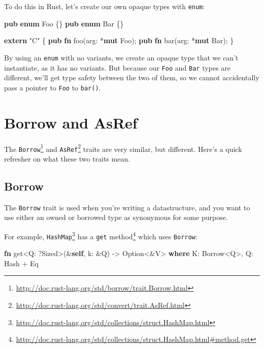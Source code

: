 \documentclass[a4paper,]{book}
\newenvironment{Shaded}{\begin{snugshade}}{\end{snugshade}}
\newcommand{\KeywordTok}[1]{\textcolor[rgb]{0.13,0.29,0.53}{\textbf{{#1}}}}
\newcommand{\DataTypeTok}[1]{\textcolor[rgb]{0.13,0.29,0.53}{{#1}}}
\newcommand{\StringTok}[1]{\textcolor[rgb]{0.31,0.60,0.02}{{#1}}}
\newcommand{\BuiltInTok}[1]{{#1}}
\newcommand{\NormalTok}[1]{{#1}}
\renewcommand{\href}[2]{#2\footnote{\url{#1}}}
\begin{document}
To do this in Rust, let's create our own opaque types with
\texttt{enum}:

\begin{Shaded}
\begin{Highlighting}[]
\KeywordTok{pub} \KeywordTok{enum} \NormalTok{Foo \{\}}
\KeywordTok{pub} \KeywordTok{enum} \NormalTok{Bar \{\}}

\KeywordTok{extern} \StringTok{"C"} \NormalTok{\{}
    \KeywordTok{pub} \KeywordTok{fn} \NormalTok{foo(arg: *}\KeywordTok{mut} \NormalTok{Foo);}
    \KeywordTok{pub} \KeywordTok{fn} \NormalTok{bar(arg: *}\KeywordTok{mut} \NormalTok{Bar);}
\NormalTok{\}}
\end{Highlighting}
\end{Shaded}

By using an \texttt{enum} with no variants, we create an opaque type
that we can't instantiate, as it has no variants. But because our
\texttt{Foo} and \texttt{Bar} types are different, we'll get type safety
between the two of them, so we cannot accidentally pass a pointer to
\texttt{Foo} to \texttt{bar()}.

\section{Borrow and AsRef}\label{sec--borrow-and-asref}

The
\href{http://doc.rust-lang.org/std/borrow/trait.Borrow.html}{\texttt{Borrow}}
and
\href{http://doc.rust-lang.org/std/convert/trait.AsRef.html}{\texttt{AsRef}}
traits are very similar, but different. Here's a quick refresher on what
these two traits mean.

\subsection{Borrow}\label{borrow}

The \texttt{Borrow} trait is used when you're writing a datastructure,
and you want to use either an owned or borrowed type as synonymous for
some purpose.

For example,
\href{http://doc.rust-lang.org/std/collections/struct.HashMap.html}{\texttt{HashMap}}
has a
\href{http://doc.rust-lang.org/std/collections/struct.HashMap.html\#method.get}{\texttt{get}
method} which uses \texttt{Borrow}:

\begin{Shaded}
\begin{Highlighting}[]
\KeywordTok{fn} \NormalTok{get<Q: ?}\BuiltInTok{Sized}\NormalTok{>(&}\KeywordTok{self}\NormalTok{, k: &Q) -> }\DataTypeTok{Option}\NormalTok{<&V>}
    \KeywordTok{where} \NormalTok{K: Borrow<Q>,}
          \NormalTok{Q: }\BuiltInTok{Hash} \NormalTok{+ }\BuiltInTok{Eq}
\end{Highlighting}
\end{Shaded}
\end{document}
